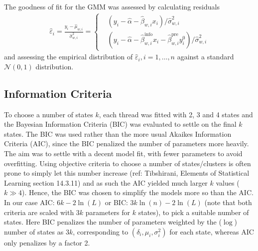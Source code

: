 \documentclass[9pt,twocolumn,twoside,lineno]{pnas-new}
\begin{document}
{The goodness of fit for the GMM was assessed by calculating residuals
\begin{align}
 	\hat{\varepsilon}_i = \frac{y_i - \hat{\mu}_{w,i}}{\hat{\sigma}^2_{w,i}} = \begin{cases}
																							& (y_i - \hat{\alpha}-\hat{\beta}_{w,i}x_i)/\hat{\sigma}^2_{w,i} \\
																							& (y_i - \hat{\alpha}-\hat{\beta}^{\text{info}}_{w,i}x_i-\hat{\beta}^{\text{pre}}_{w,i}y^0_i)/\hat{\sigma}^2_{w,i}
																					\end{cases} \label{eq: GMM residuals}
\end{align}
and assessing the empirical distribution of $\hat{\varepsilon}_i, i=1,\dots,n$ against a standard $\mathcal{N}(0,1)$ distribution.
\subsection*{Information Criteria}
To choose a number of states $k$, each thread was fitted with 2, 3 and 4 states and the Bayesian Information Criteria (BIC) was evaluated to settle on the final $k$ states. The BIC was used rather than the more usual Akaikes Information Criteria (AIC), since the BIC penalized the number of parameters more heavily. The aim was to settle with a decent model fit, with fewer parameters to avoid overfitting. Using objective criteria to choose a number of states/clusters is often prone to simply let this number increase (ref: Tibshirani, Elements of Statistical Learning section 14.3.11) and as such the AIC yielded much larger $k$ values ($k \gg 4$).  Hence, the BIC was chosen to simplify the models more so than the AIC. 
 In our case AIC: $6k-2\ln(L)$ or BIC: $3k\ln(n)-2\ln(L)$ (note that both criteria are scaled with $3k$ parameters for $k$ states), to pick a suitable number of states. Here BIC penalizes the number of parameters weighted by the ($\log$) number of states as $3k$, corresponding to $(\delta_i,\mu_i,\sigma^2_i)$ for each state, whereas AIC only penalizes by a factor 2. 
}
\end{document}
